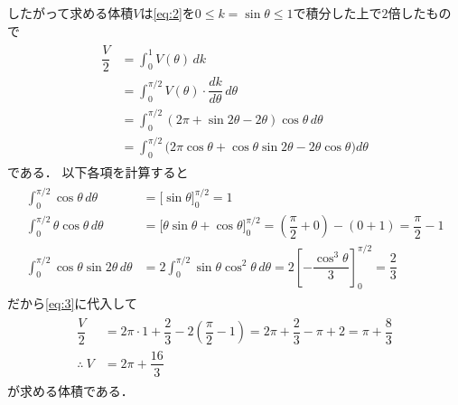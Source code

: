 \documentclass[../../main.tex]{subfiles}
\begin{document}
したがって求める体積$V$は\cref{eq:2}を$0\le k=\sin\theta \le 1$で積分した上で$2$倍したもので
\begin{align}
  \begin{split}
    \dfrac{V}{2}
    &=\int_0^1V(\theta)\,dk \\
    &=\int_0^{\pi/2}V(\theta)\cdot\dfrac{dk}{d\theta}\,d\theta \\
    &=\int_0^{\pi/2}(2\pi+\sin2\theta-2\theta)\cos\theta\,d\theta \\
    &=\int_0^{\pi/2}\bigl(2\pi\cos\theta+\cos\theta\sin2\theta-2\theta\cos\theta\bigr)d\theta \label{eq:3}
  \end{split}
\end{align}
である．
以下各項を計算すると
\begin{align}
  \begin{split}
    \int_0^{\pi/2}\cos\theta \,d\theta&=\bigl[\sin\theta\bigr]_0^{\pi/2}=1 \\
    \int_0^{\pi/2}\theta\cos\theta\,d\theta&=\bigl[\theta\sin\theta+\cos\theta\bigr]_0^{\pi/2}=\left(\dfrac{\pi}{2}+0\right)-(0+1)=\dfrac{\pi}{2}-1 \\
    \int_0^{\pi/2}\cos\theta\sin2\theta\,d\theta&=2\int_0^{\pi/2}\sin\theta\cos^2\theta\,d\theta=2\left[-\dfrac{\cos^3\theta}{3}\right]_0^{\pi/2}=\dfrac{2}{3}
  \end{split}
\end{align}
だから\cref{eq:3}に代入して
\begin{align}
  \begin{split}
    \dfrac{V}{2}&=2\pi\cdot1+\dfrac{2}{3}-2\left(\dfrac{\pi}{2}-1\right)=2\pi+\dfrac{2}{3}-\pi+2=\pi+\dfrac{8}{3} \\
    \therefore\
    V&=2\pi+\dfrac{16}{3}
  \end{split}
\end{align}
が求める体積である．

\newpage
\end{document}
